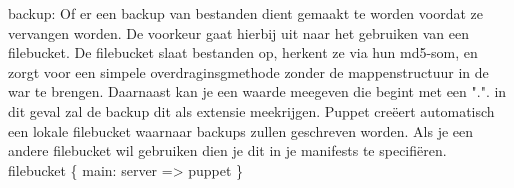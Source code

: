 	backup:
	Of er een backup van bestanden dient gemaakt te worden voordat ze vervangen worden. De voorkeur gaat hierbij uit naar het gebruiken van een filebucket.	De filebucket slaat bestanden op, herkent ze via hun md5-som, en zorgt voor een simpele overdraginsgmethode zonder de mappenstructuur in de war te brengen. Daarnaast kan je een waarde meegeven die begint met een ".". in dit geval zal de backup dit als extensie meekrijgen. Puppet cre\"{e}ert automatisch een lokale filebucket waarnaar backups zullen geschreven worden. Als je een andere filebucket wil gebruiken dien je dit in je manifests te specifi\"{e}ren.\\

	  filebucket \{ main:
	    server => puppet
	  \}

%
%
%
%
%
%

